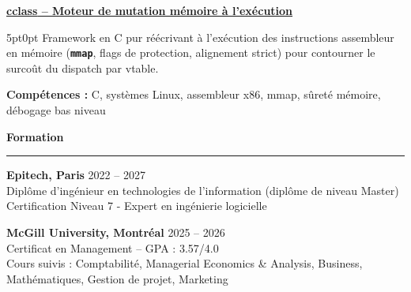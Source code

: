 \documentclass[9pt]{extarticle}
\begin{document}
\par\vspace{8pt}

\underline{\bfseries \href{https://github.com/paulogarithm/cclass}{cclass} -- Moteur de mutation mémoire à l'exécution}
\par
\begin{adjustwidth}{5pt}{0pt}
    Framework en C pur réécrivant à l'exécution des instructions assembleur en mémoire ({\bfseries \texttt{mmap}}, flags de protection, alignement strict) pour contourner le surcoût du dispatch par vtable.
\end{adjustwidth}
\par
{\bfseries Compétences :} C, systèmes Linux, assembleur x86, mmap, sûreté mémoire, débogage bas niveau

\par\vspace{8pt}

{\large\bfseries Formation}
\par\vspace{-8pt}
\rule{\linewidth}{0.4pt}
\par\vspace{5pt}

{\bfseries Epitech, Paris} \hfill 2022 -- 2027 \\
Diplôme d'ingénieur en technologies de l'information (diplôme de niveau Master) \\
Certification Niveau 7 - Expert en ingénierie logicielle

\vspace{6pt}

{\bfseries McGill University, Montréal} \hfill 2025 -- 2026 \\
Certificat en Management -- GPA : 3.57/4.0 \\
Cours suivis : Comptabilité, Managerial Economics \& Analysis, Business, Mathématiques, Gestion de projet, Marketing
\end{document}
